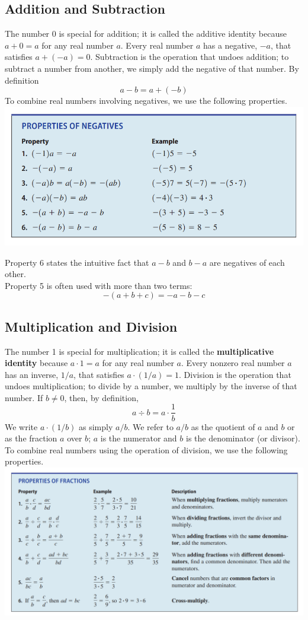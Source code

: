 \subsection{Addition and Subtraction}
The number 0 is special for addition; it is called the additive identity because $a+0=a$ for any real number $a$. Every real number $a$ has a negative, $-a$, that satisfies $a+(-a)=0$. Subtraction is the operation that undoes addition; to subtract a number from another, we simply add the negative of that number. By definition
$$
a-b=a+(-b)
$$
To combine real numbers involving negatives, we use the following properties.
\includegraphics[width=1.1\textwidth]{algebra-pre-calculus/algebra/essentials/properties_addition_subtraction.png}

Property 6 states the intuitive fact that $a-b$ and $b-a$ are negatives of each other. \\
Property 5 is often used with more than two terms:
$$
    -(a+b+c)=-a-b-c
$$

\subsection{Multiplication and Division}
The number 1 is special for multiplication; it is called the \textbf{multiplicative identity} because $a \cdot 1=a$ for any real number $a$. Every nonzero real number $a$ has an inverse, $1 / a$, that satisfies $a \cdot(1 / a)=1$. Division is the operation that undoes multiplication; to divide by a number, we multiply by the inverse of that number. If $b \neq 0$, then, by definition,
$$
a \div b=a \cdot \frac{1}{b}
$$
We write $a \cdot(1 / b)$ as simply $a / b$. We refer to $a / b$ as the quotient of $a$ and $b$ or as the fraction $a$ over $b$; $a$ is the numerator and $b$ is the denominator (or divisor). To combine real numbers using the operation of division, we use the following properties. \\
\includegraphics[width=1.1\textwidth]{algebra-pre-calculus/algebra/essentials/properties_multiplication_division.png}

